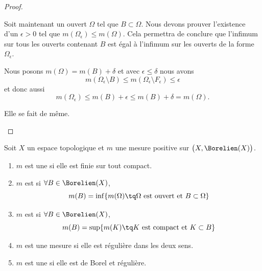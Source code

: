 \begin{proof}
\begin{subproof}
		Soit maintenant un ouvert \( \Omega\) tel que \( B\subset \Omega\). Nous devons prouver l'existence d'un \( \epsilon>0\) tel que \( m(\Omega_{\epsilon})\leq m(\Omega)\). Cela permettra de conclure que l'infimum sur tous les ouverts contenant \( B\) est égal à l'infimum sur les ouverts de la forme \( \Omega_{\epsilon}\).

		Nous posons \( m(\Omega)=m(B)+\delta\) et avec \( \epsilon\leq \delta\) nous avons
		\begin{equation}
			m(\Omega_{\epsilon}\setminus B)\leq m(\Omega_{\epsilon}\setminus F_{\epsilon})\leq \epsilon
		\end{equation}
		et donc aussi
		\begin{equation}
			m(\Omega_{\epsilon})\leq m(B)+\epsilon\leq m(B)+\delta=m(\Omega).
		\end{equation}

		Elle se fait de même.
	\end{subproof}
\end{proof}

\begin{definition}      \label{DefFMTEooMjbWKK}
	Soit \( X\) un espace topologique et \( m\) une mesure positive sur \( \big( X,\Borelien(X) \big)\).
	\begin{enumerate}
		\item       \label{ItemTTPTooStDcpw}
		      \( m\) est une  si elle est finie sur tout compact.
		\item
		      \( m\) est  si \( \forall B\in\Borelien(X)\),
		      \begin{equation}
			      m(B)=\inf\{ m(\Omega)\tq \Omega\text{ est ouvert et } B\subset \Omega \}
		      \end{equation}
		\item
		      \( m\) est  si \( \forall B\in\Borelien(X)\),
		      \begin{equation}
			      m(B)=\sup\{ m(K)\tq K\text{ est compact et } K\subset B  \}
		      \end{equation}
		\item
		      \( m\) est une mesure  si elle est régulière dans les deux sens.
		\item
		      \( m\) est une  si elle est de Borel et régulière.
	\end{enumerate}
\end{definition}

